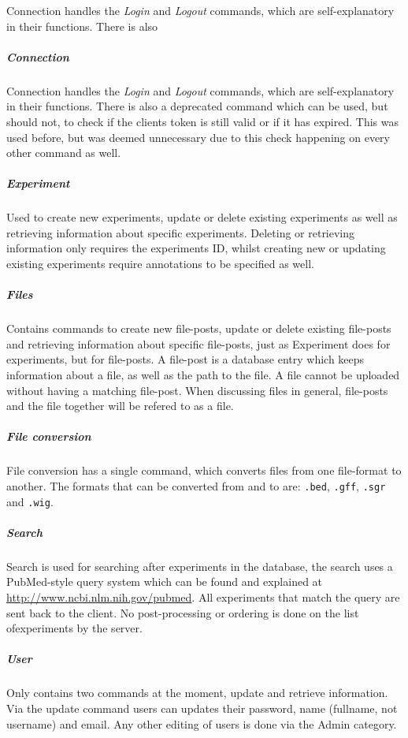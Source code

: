 Connection handles the \textit{Login} and \textit{Logout} commands, which are self-explanatory in their functions. There is also

\subparagraph*{Connection}

Connection handles the \textit{Login} and \textit{Logout} commands, which are self-explanatory in their functions. There is also a deprecated command which can be used, but should not, to check if the clients token is still valid or if it has expired. This was used before, but was deemed unnecessary due to this check happening on every other command as well. 

\subparagraph*{Experiment}

Used to create new experiments, update or delete existing experiments as well as retrieving information about specific experiments. Deleting or retrieving information only requires the experiments ID, whilst creating new or updating existing experiments require annotations to be specified as well.

\subparagraph*{Files}

Contains commands to create new file-posts, update or delete existing file-posts and retrieving information about specific file-posts, just as Experiment does for experiments, but for file-posts. A file-post is a database entry which keeps information about a file, as well as the path to the file. A file cannot be uploaded without having a matching file-post. When discussing files in general, file-posts and the file together will be refered to as a file. 

\subparagraph*{File conversion}

File conversion has a single command, which converts files from one file-format to another. The formats that can be converted from and to are: \texttt{.bed}, \texttt{.gff}, \texttt{.sgr} and \texttt{.wig}. 

\subparagraph*{Search}

Search is used for searching after experiments in the database, the search uses a PubMed-style query system which can be found and explained at \url{http://www.ncbi.nlm.nih.gov/pubmed}. All experiments that match the query are sent back to the client. No post-processing or ordering is done on the list ofexperiments by the server.

\subparagraph*{User}

Only contains two commands at the moment, update and retrieve information. Via the update command users can updates their password, name (fullname, not username) and email. Any other editing of users is done via the Admin category. 


